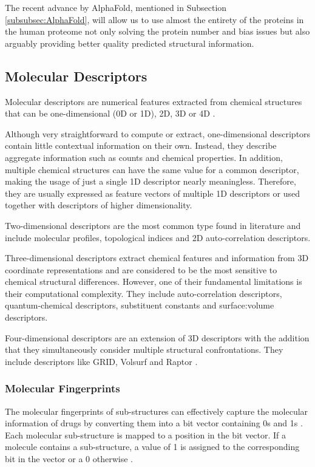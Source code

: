 The recent advance by AlphaFold, mentioned in Subsection \ref{subsubsec:AlphaFold}, will allow us to use almost the entirety of the proteins in the human proteome not only solving the protein number and bias issues but also arguably providing better quality predicted structural information.

\subsection{Molecular Descriptors}
\label{subsec:Molecular_Descriptors}

Molecular descriptors are numerical features extracted from chemical structures that can be one-dimensional (0D or 1D), 2D, 3D or 4D \citep{Lo2018}.

Although very straightforward to compute or extract, one-dimensional descriptors contain little contextual information on their own. Instead, they describe aggregate information such as counts and chemical properties. In addition, multiple chemical structures can have the same value for a common descriptor, making the usage of just a single 1D descriptor nearly meaningless. Therefore, they are usually expressed as feature vectors of multiple 1D descriptors or used together with descriptors of higher dimensionality.

Two-dimensional descriptors are the most common type found in literature and include molecular profiles, topological indices and 2D auto-correlation descriptors. 

Three-dimensional descriptors extract chemical features and information from 3D coordinate representations and are considered to be the most sensitive to chemical structural differences. However, one of their fundamental limitations is their computational complexity. They include auto-correlation descriptors, quantum-chemical descriptors, substituent constants and surface:volume descriptors. 

Four-dimensional descriptors are an extension of 3D descriptors with the addition that they simultaneously consider multiple structural confrontations. They include descriptors like GRID, Volsurf and Raptor \citep{Lo2018}.

\subsubsection{Molecular Fingerprints}
\label{subsubsec:Molecular_Fingerprints}

The molecular fingerprints of sub-structures can effectively capture the molecular information of drugs by converting them into a bit vector containing 0s and 1s \citep{Wang2020}. Each molecular sub-structure is mapped to a position in the bit vector. If a molecule contains a sub-structure, a value of 1 is assigned to the corresponding bit in the vector or a 0 otherwise \citep{PubChem_Fingerprints}. 

